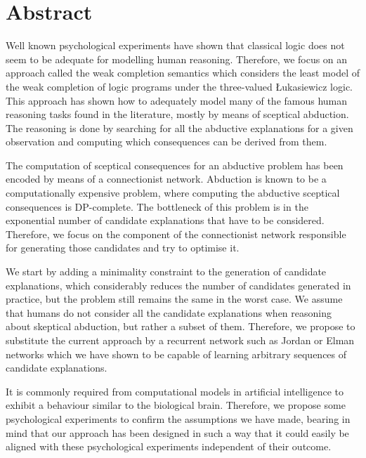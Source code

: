 
\chapter*{Abstract}
\label{sec:abstract}

Well known psychological experiments have shown that classical logic does not seem to be adequate for modelling human reasoning. Therefore, we focus on an approach called the weak completion semantics which considers the least model of the weak completion of logic programs under the three-valued {\L}ukasiewicz logic. This approach has shown how to adequately model many of the famous human reasoning tasks found in the literature, mostly by means of sceptical abduction. The reasoning is done by searching for all the abductive explanations for a given observation and computing which consequences can be derived from them. 

The computation of sceptical consequences for an abductive problem has been encoded by means of a connectionist network. Abduction is known to be a computationally expensive problem, where computing the abductive sceptical consequences is DP-complete. The bottleneck of this problem is in the exponential number of candidate explanations that have to be considered. Therefore, we focus on the component of the connectionist network responsible for generating those candidates and try to optimise it.

We start by adding a minimality constraint to the generation of candidate explanations, which considerably reduces the number of candidates generated in practice, but the problem still remains the same in the worst case. We assume that humans do not consider all the candidate explanations when reasoning about skeptical abduction, but rather a subset of them. Therefore, we propose to substitute the current approach by a recurrent network such as Jordan or Elman networks which we have shown to be capable of learning arbitrary sequences of candidate explanations.

It is commonly required from computational models in artificial intelligence to exhibit a behaviour similar to the biological brain. Therefore, we propose some psychological experiments to confirm the assumptions we have made, bearing in mind that our approach has been designed in such a way that it could easily be aligned with these psychological experiments independent of their outcome.